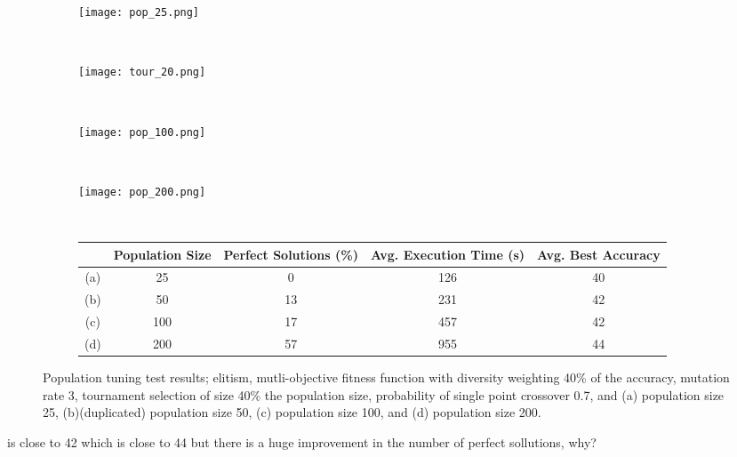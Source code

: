 \begin{figure}
	\centering
	\begin{subfigure}[ht]{0.49\textwidth}
		\texttt{[image: pop\_25.png]}
		\caption{}
		\vspace{1em}
	\end{subfigure}
	~
	\begin{subfigure}[ht]{0.49\textwidth}
		\texttt{[image: tour\_20.png]}
		\caption{}
		\vspace{1em}
	\end{subfigure}
	~
	\begin{subfigure}[ht]{0.49\textwidth}
		\texttt{[image: pop\_100.png]}
		\caption{}
		\vspace{1em}
	\end{subfigure}
	~
	\begin{subfigure}[ht]{0.49\textwidth}
		\texttt{[image: pop\_200.png]}
		\caption{}
		\vspace{1em}
	\end{subfigure}
	~
	\begin{subfigure}[ht]{\textwidth}
		\centering
		\begin{tabular}{ccccc}
			\toprule
			& \bfseries{Population Size} &
			\bfseries{Perfect Solutions (\%)} &
			\bfseries{Avg. Execution Time (s)} & \bfseries{Avg. Best Accuracy}\\
			\midrule
			(a) & 25 & 0 & 126 & 40\\
			(b) & 50 & 13 & 231 & 42\\
			(c) & 100 & 17 & 457 & 42\\
			(d) & 200 & 57 & 955 & 44\\
			\bottomrule
		\end{tabular}
	\end{subfigure}

	\caption[Population tuning test results]{Population tuning test results;
	elitism, mutli-objective fitness function with diversity weighting 40\%
	of the accuracy, mutation rate 3, tournament selection of size 40\%
	the population size, probability of single point crossover 0.7, and
	(a) population size 25, (b)(duplicated) population size 50, (c) population size 100,
	and (d) population size 200.}
	\label{fig:pop}
\end{figure}

 is close to 42 which is close to 44 but there is a huge improvement in
the number of perfect sollutions, why?

